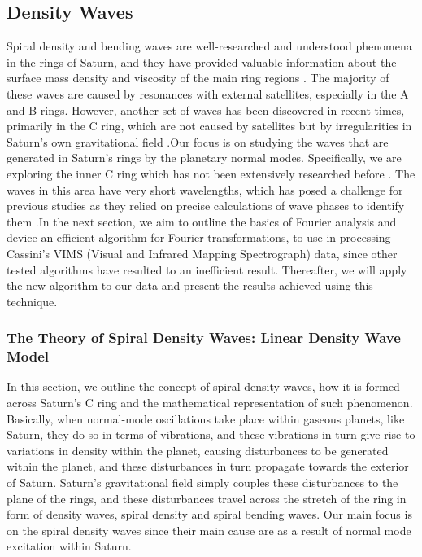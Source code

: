 \documentclass[conference]{IEEEtran}
\begin{document}
\subsection{Density Waves}
Spiral density and bending waves are well-researched and understood phenomena in the rings of Saturn, and they have provided valuable information about the surface mass density and viscosity of the main ring regions \cite{2009sfch.book..375C}\cite{Hedman_2013}\cite{2020AGUA....100142M}. The majority of these waves are caused by resonances with external satellites, especially in the A and B rings. However, another set of waves has been discovered in recent times, primarily in the C ring, which are not caused by satellites but by irregularities in Saturn's own gravitational field \cite{Hedman_2013}\cite{2014MNRAS.444.1369H}\cite{Hedman_2018}.Our focus is on studying the waves that are generated in Saturn's rings by the planetary normal modes. Specifically, we are exploring the inner C ring which has not been extensively researched before \cite{FRENCH2019599}\cite{Hedman_2013}. The waves in this area have very short wavelengths, which has posed a challenge for previous studies as they relied on precise calculations of wave phases to identify them \cite{FRENCH2019599}\cite{Hedman_2013}\cite{Hedman_2018}\cite{Tiscareno_2007}.In the next section, we aim to outline the basics of Fourier analysis and device an efficient algorithm for Fourier transformations, to use in processing Cassini's VIMS (Visual and Infrared Mapping Spectrograph) data, since other tested algorithms have resulted to an inefficient result. Thereafter, we will apply the new algorithm to our data and present the results achieved using this technique.


\subsubsection{The Theory of Spiral Density Waves: Linear Density Wave Model}
In this section, we outline the concept of spiral density waves, how it is formed across Saturn's C ring and the mathematical representation of such phenomenon.
Basically, when normal-mode oscillations take place within gaseous planets, like Saturn, they do so in terms of vibrations, and these vibrations in turn give rise to variations in density within the planet, causing disturbances to be generated within the planet, and these disturbances in turn propagate towards the exterior of Saturn. Saturn's gravitational field simply couples these disturbances to the plane of the rings, and these disturbances travel across the stretch of the ring in form of density waves, spiral density and spiral bending waves. Our main focus is on the spiral density waves since their main cause are as a result of normal mode excitation within Saturn.
\end{document}
